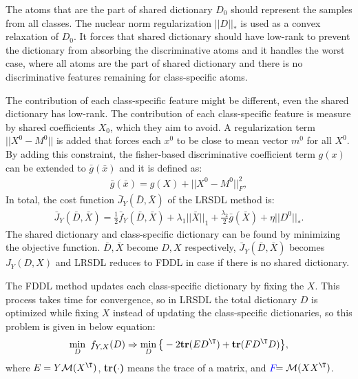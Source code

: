 The atoms that are the part of shared dictionary $D_0$ should represent the samples from all classes. The nuclear norm regularization $||D||_*$ is used as a convex relaxation of $D_0$. It forces that shared dictionary should have low-rank to prevent the dictionary from absorbing the discriminative atoms and it handles the worst case, where all atoms are the part of shared dictionary and there is no discriminative features remaining for class-specific atoms.

The contribution of each class-specific feature might be different, even the shared dictionary has low-rank. The contribution of each class-specific feature is measure by shared coefficients $X_0$, which they aim to avoid. A regularization term $||X^0 - M^0||$ is added that forces each $x^0$ to be close to mean vector $m^0$ for all $X^0$. By adding this constraint, the fisher-based discriminative coefficient term $g(x)$ can be extended to $\bar{g}(\bar{x})$ and it is defined as:
\begin{equation}
\begin{aligned}
	\bar{g}(\bar{x}) = g(X) +||X^0-M^0||_F^2,
	\end{aligned}
	\label{extendg(x)}
\end{equation}
In total, the cost function $\bar{J}_Y(\bar{D},\bar{X})$ of the LRSDL method is: 
\begin{equation}
\begin{aligned}
\bar{J}_Y(\bar{D},\bar{X}) = \frac{1}{2}\bar{f}_Y(\bar{D},\bar{X})+\lambda_1||\bar{X}||_1 + \frac{\lambda_2}{2}\bar{g}(\bar{X}) + \eta||D^0||_*.
\end{aligned}
\label{lrsdlcostfunction}
\end{equation}
The shared dictionary and class-specific dictionary can be found by minimizing the objective function. $\bar{D}, \bar{X}$ become $D, X$ respectively, $\bar{J}_Y(\bar{D},\bar{X})$ becomes $J_Y({D},{X})$ and LRSDL reduces to FDDL in case if there is no shared dictionary.

The FDDL method updates each class-specific dictionary by fixing the $X$. This process takes time for convergence, so in LRSDL the total dictionary $D$ is optimized while fixing $X$ instead of updating the class-specific dictionaries, so this problem is given in below equation:
\begin{equation}
\begin{aligned}
\min_D \ f_{Y,X}(D) \Rightarrow \min_D\big\{-2 \textbf{tr}(ED^\T) +\textbf{tr}(FD^\T D)\big\},
\end{aligned}
\label{eq:DL1}
\end{equation}
where $E= Y \mathcal{M}(X^\T) $, \textbf{tr($\cdot$)} means the trace of a matrix, and \textcolor{blue}{${F}$}$ = \mathcal{M}(XX^\T)$.

